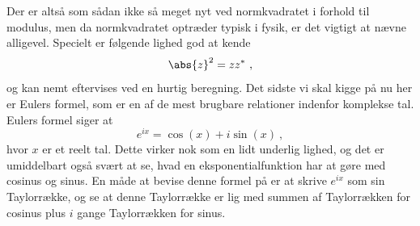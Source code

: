 Der er altså som sådan ikke så meget nyt ved normkvadratet i forhold til modulus, men da normkvadratet optræder typisk i fysik, er det vigtigt at nævne alligevel. Specielt er følgende lighed god at kende
\begin{equation}
\abs{z}^2 = zz^* \ ,
\end{equation} 
og kan nemt eftervises ved en hurtig beregning. Det sidste vi skal kigge på nu her er Eulers formel, som er en af de mest brugbare relationer indenfor komplekse tal. Eulers formel siger at
\begin{equation}
e^{ix} = \cos(x) + i \sin(x) \ ,
\end{equation}
hvor $x$ er et reelt tal. Dette virker nok som en lidt underlig lighed, og det er umiddelbart også svært at se, hvad en eksponentialfunktion har at gøre med cosinus og sinus. En måde at bevise denne formel på er at skrive $e^{ix}$ som sin Taylorrække, og se at denne Taylorrække er lig med summen af Taylorrækken for cosinus plus $i$ gange Taylorrækken for sinus.

